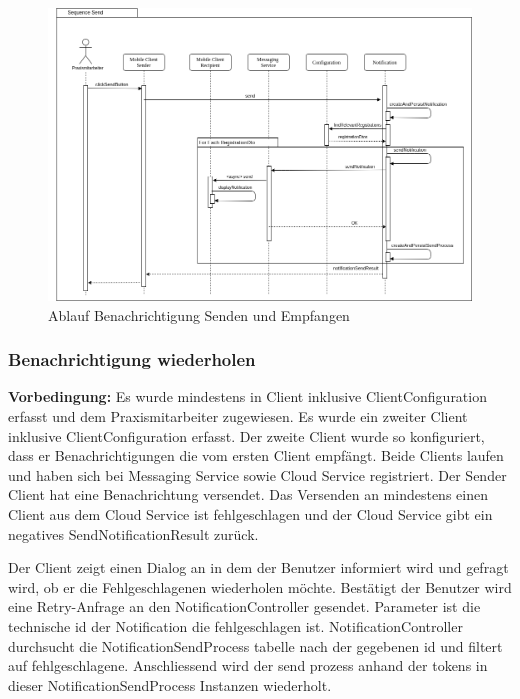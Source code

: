 \begin{figure}[h]
    \centering
    \begin{minipage}[b]{0.9\textwidth}
        \includegraphics[width=\textwidth]{graphics/Sequence_Notification_Send}
        \caption{Ablauf Benachrichtigung Senden und Empfangen}
    \end{minipage}
\end{figure}


\clearpage
\subsubsection*{Benachrichtigung wiederholen}

\textbf{Vorbedingung:} Es wurde mindestens in Client inklusive ClientConfiguration erfasst und dem Praxismitarbeiter zugewiesen.
Es wurde ein zweiter Client inklusive ClientConfiguration erfasst.
Der zweite Client wurde so konfiguriert, dass er Benachrichtigungen die vom ersten Client empfängt.
Beide Clients laufen und haben sich bei Messaging Service sowie Cloud Service registriert.
Der Sender Client hat eine Benachrichtung versendet.
Das Versenden an mindestens einen Client aus dem Cloud Service ist fehlgeschlagen und der Cloud Service gibt ein negatives SendNotificationResult zurück.


Der Client zeigt einen Dialog an in dem der Benutzer informiert wird und gefragt wird, ob er die Fehlgeschlagenen wiederholen möchte.
Bestätigt der Benutzer wird eine Retry-Anfrage an den NotificationController gesendet.
Parameter ist die technische id der Notification die fehlgeschlagen ist.
NotificationController durchsucht die NotificationSendProcess tabelle nach der gegebenen id und filtert auf fehlgeschlagene.
Anschliessend wird der send prozess anhand der tokens in dieser NotificationSendProcess Instanzen wiederholt.

